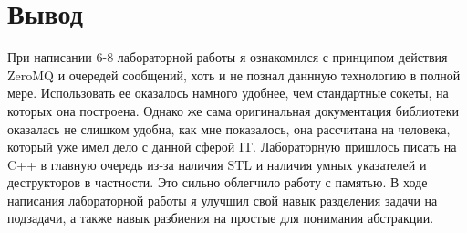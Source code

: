 \section{Вывод}

При написании 6-8 лабораторной работы я ознакомился с принципом действия ZeroMQ и очередей сообщений, хоть и не познал даннную технологию в полной мере. Использовать ее оказалось намного удобнее, чем стандартные сокеты, на которых она построена. Однако же сама оригинальная документация библиотеки оказалась не слишком удобна, как мне показалось, она рассчитана на человека, который уже имел дело с данной сферой IT. Лабораторную пришлось писать на C++ в главную очередь из-за наличия STL и наличия умных указателей и деструкторов в частности. Это сильно облегчило работу с памятью. В ходе написания лабораторной работы я улучшил свой навык разделения задачи на подзадачи, а также навык разбиения на простые для понимания абстракции.

